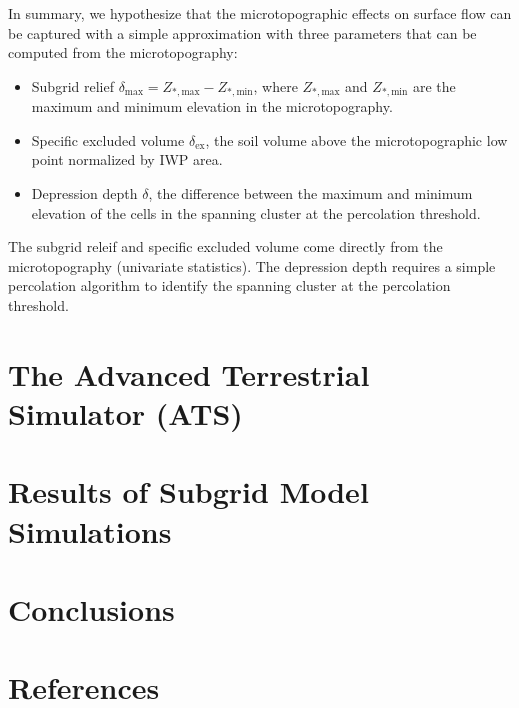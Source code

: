 \documentclass[review,11pt]{elsarticle}
\begin{document}
In summary, we hypothesize that the microtopographic effects on surface flow can be captured with a simple approximation with three parameters that can be computed from the microtopography:

\begin{itemize}
\item Subgrid relief $\delta_\text{max} = Z_{*,\text{max}} -   Z_{*,\text{min}}$, where  $Z_{*,\text{max}}$ and  $Z_{*,\text{min}}$ are the maximum and minimum elevation in the microtopography. 
\item Specific excluded volume $\delta_\text{ex}$, the soil volume above the microtopographic low point normalized by IWP area.
\item Depression depth $\delta$, the difference between the maximum and minimum elevation of the cells in the spanning cluster at the percolation threshold.
\end{itemize}
The subgrid releif and specific excluded volume come directly from the microtopography (univariate statistics). The depression depth requires a simple percolation algorithm to identify the spanning cluster at the percolation threshold.

\section{The Advanced Terrestrial Simulator (ATS)}\label{ATS}
\section{Results of Subgrid Model Simulations}\label{numerical-tests}

\section{Conclusions}\label{conclusion}

\section*{References}


\end{document}
